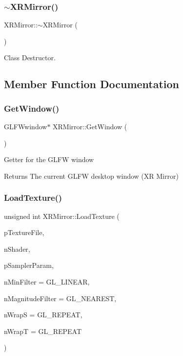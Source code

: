 \subsubsection{\texorpdfstring{$\sim$XRMirror()}{~XRMirror()}}
{\footnotesize\ttfamily X\+R\+Mirror\+::$\sim$\+X\+R\+Mirror (\begin{DoxyParamCaption}{ }\end{DoxyParamCaption})}



Class Destructor. 



\subsection{Member Function Documentation}
\mbox{\label{class_x_r_mirror_a966faccfee88f1f4ca2b8cfc881658c0}} 
\subsubsection{\texorpdfstring{GetWindow()}{GetWindow()}}
{\footnotesize\ttfamily G\+L\+F\+Wwindow$\ast$ X\+R\+Mirror\+::\+Get\+Window (\begin{DoxyParamCaption}{ }\end{DoxyParamCaption})\hspace{0.3cm}{\ttfamily [inline]}}

Getter for the G\+L\+FW window \begin{DoxyReturn}{Returns}
The current G\+L\+FW desktop window (XR Mirror) 
\end{DoxyReturn}
\mbox{\label{class_x_r_mirror_aee8cb008c3732293fb45ef056a4f1fc6}} 
\subsubsection{\texorpdfstring{LoadTexture()}{LoadTexture()}}
{\footnotesize\ttfamily unsigned int X\+R\+Mirror\+::\+Load\+Texture (\begin{DoxyParamCaption}\item[{const wchar\+\_\+t $\ast$}]{p\+Texture\+File,  }\item[{G\+Luint}]{n\+Shader,  }\item[{const char $\ast$}]{p\+Sampler\+Param,  }\item[{G\+Lint}]{n\+Min\+Filter = {\ttfamily GL\+\_\+LINEAR},  }\item[{G\+Lint}]{n\+Magnitude\+Filter = {\ttfamily GL\+\_\+NEAREST},  }\item[{G\+Lint}]{n\+WrapS = {\ttfamily GL\+\_\+REPEAT},  }\item[{G\+Lint}]{n\+WrapT = {\ttfamily GL\+\_\+REPEAT} }\end{DoxyParamCaption})}

